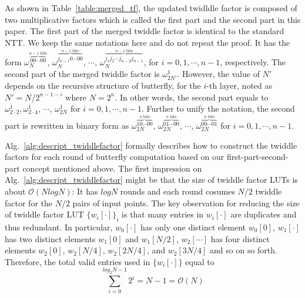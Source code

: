 \documentclass{iacrtrans}
\theoremstyle{plain}
\begin{document}
 As shown in Table~\ref{table:merged_tf}, the updated twidldle factor is composed of two multiplicative factors which is called the first part and the second part in this paper. The first part of the merged twiddle factor is identical to the standard NTT. We keep the same notations here and do not repeat the proof. It has the form $\omega_{N}^{\overbrace{00\cdots 00}^{n-1 \text{ bits}}}$, $\omega_{N}^{\overbrace{j_{n-1}0\cdots 00}^{n-1 \text{ bits}}}$, $\cdots$, $\omega_{N}^{\overbrace{j_1j_2\cdots j_{n-2}j_{n-1}}^{n-1 \text{ bits}}}$, for $i=0,1,\cdots,n-1$, respectively.
The second part of the merged twiddle factor is $\omega_{2N'}^1$. However, the value of $N'$ depends on the recursive structure of butterfly, for the $i$-th layer, noted as $N'=N/2^{n-1-i}$ where $N=2^n$. In other words, the second part equals to $\omega_{2\cdot 2}^1, \omega_{2\cdot 4}^1$, $\cdots$, $\omega_{2N}^1$ for $i=0,1,\cdots,n-1$. Further to unify the notation, the second part is rewritten in binary form as $\omega_{2N}^{\overbrace{10\cdots 00}^{n\text{ bits}}}$, $\omega_{2N}^{\overbrace{01\cdots 00}^{n\text{ bits}}}$, $\cdots$, $\omega_{2N}^{\overbrace{00\cdots 01}^{n\text{ bits}}}$ for $i=0,1,\cdots,n-1$.

Alg.~\ref{alg:descript_twiddlefactor} formally describes how to construct the twiddle factors for each round of butterfly computation based on our first-part-second-part concept mentioned above.
The first impression on Alg.~\ref{alg:descript_twiddlefactor} might be that the size of twiddle factor LUTs is about $\mathcal{O}(NlogN)$: It has $logN$ rounds and each round cosumes $N/2$ twiddle factor for the $N/2$ pairs of input points.  The key observation for reducing the size of twiddle factor LUT $\{w_i[\cdot]\}_i$ is that many entries in $w_i[\cdot]$ are duplicates and thus redundant. In particular, $w_0[\cdot]$ has only one distinct element $w_0[0]$, $w_1[\cdot]$ has two distinct elements $w_1[0]$ and $w_1[N/2]$, $w_2[\cdots]$ has four distinct elements $w_2[0]$, $w_2[N/4]$, $w_2[2N/4]$, and $w_2[3N/4]$ and so on so forth. Therefore, the total valid entries used in $\{w_i[\cdot]\}$ equal to
\[
\sum_{i=0}^{log_2N-1} 2^i = N-1 = \mathcal{O}(N) 
\]
\end{document}
